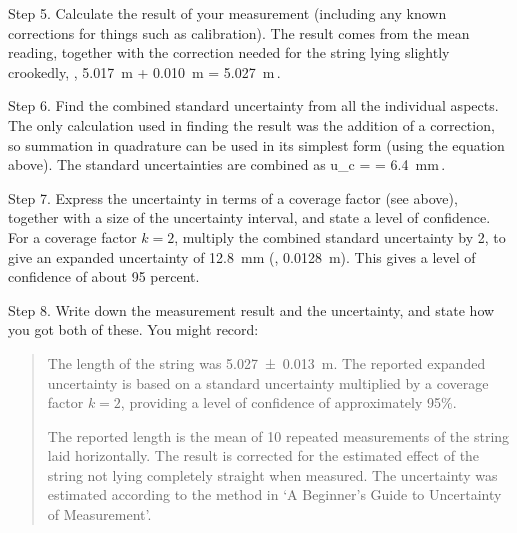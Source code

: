 Step 5. Calculate the result of your measurement (including any known corrections for things such as calibration). The result comes from the mean reading, together with the correction needed for the string lying slightly crookedly, \ie,
\beq
\SI{5.017}{m} + \SI{0.010}{m} = \SI{5.027}{m}\,.
\eeq

Step 6. Find the combined standard uncertainty from all the individual aspects. The only calculation used in finding the result was the addition of a correction, so summation in quadrature can be used in its simplest form (using the equation above). The standard uncertainties are combined as
\beq
u_c =  = \SI{6.4}{mm}\qquad{}\,.
\eeq

Step 7. Express the uncertainty in terms of a coverage factor (see above), together with a size of the uncertainty interval, and state a level of confidence. For a coverage factor $k = 2$, multiply the combined standard uncertainty by 2, to give an expanded uncertainty of \SI{12.8}{mm} (\ie, \SI{0.0128}{m}). This gives a level of confidence of about 95 percent.

Step 8. Write down the measurement result and the uncertainty, and state how you got both of these. You might record:
\begin{quote}
The length of the string was \SI{5.027+-0.013}{m}. The reported expanded uncertainty is based on a standard uncertainty multiplied by a coverage factor $k = 2$, providing a level of confidence of approximately 95\%.

The reported length is the mean of 10 repeated measurements of the string laid horizontally. The result is corrected for the estimated effect of the string not lying completely straight when measured. The uncertainty was estimated according to the method in `A Beginner's Guide to Uncertainty of Measurement'.
\end{quote}


